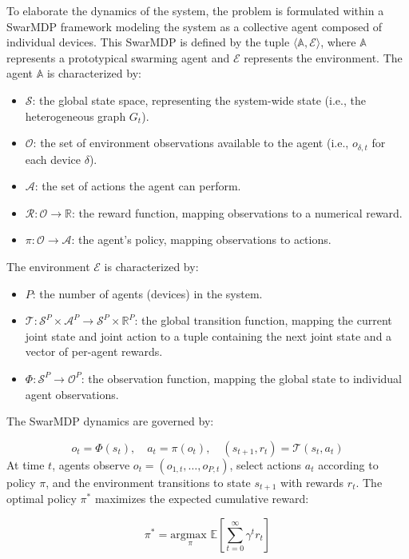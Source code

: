 To elaborate the dynamics of the system, 
 the problem is formulated within a SwarMDP framework modeling the system 
 as a collective agent composed of individual devices.
%
This SwarMDP is defined by the tuple $\langle \mathbb{A}, \mathcal{E} \rangle$, where $\mathbb{A}$ 
 represents a prototypical swarming agent and $\mathcal{E}$ represents the environment.
%
The agent $\mathbb{A}$ is characterized by:
\begin{itemize}
    \item $\mathcal{S}$: the global state space, representing the system-wide state (i.e., the heterogeneous graph $G_t$).
    \item $\mathcal{O}$: the set of environment observations available to the agent (i.e., $o_{\delta,t}$ for each device $\delta$).
    \item $\mathcal{A}$: the set of actions the agent can perform.
    \item $\mathcal{R}: \mathcal{O} \to \mathbb{R}$: the reward function, mapping observations to a numerical reward.
    \item $\pi: \mathcal{O} \to \mathcal{A}$: the agent's policy, mapping observations to actions.
\end{itemize}

The environment $\mathcal{E}$ is characterized by:
\begin{itemize}
    \item $P$: the number of agents (devices) in the system.
    \item $\mathcal{T}: \mathcal{S}^P \times \mathcal{A}^P \to \mathcal{S}^P \times \mathbb{R}^P$: the global transition function, 
    mapping the current joint state and joint action to a tuple containing the next joint state and a vector of per-agent rewards.
    \item $\Phi: \mathcal{S}^P \to \mathcal{O}^P$: the observation function, mapping the global state to individual agent observations.
\end{itemize}

The SwarMDP dynamics are governed by:

\[ o_t = \Phi(s_t), \quad a_t = \pi(o_t), \quad (s_{t+1}, r_t) = \mathcal{T}(s_t, a_t) \]
At time $t$, 
 agents observe $o_t = (o_{1,t}, \ldots, o_{P,t})$, select actions $a_t$ according to policy $\pi$, 
 and the environment transitions to state $s_{t+1}$ with rewards $r_t$. The optimal policy $\pi^*$ maximizes the expected cumulative reward:

\[ \pi^* = \underset{\pi}{\text{argmax }} \mathbb{E} \left[ \sum_{t=0}^\infty \gamma^t r_t \right] \]

